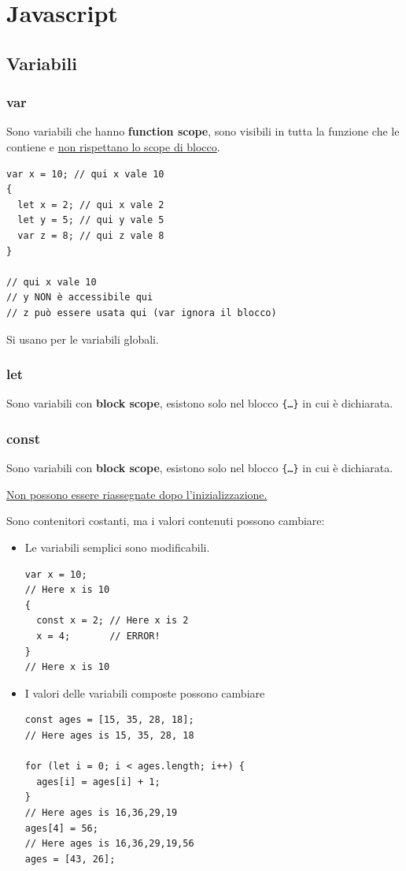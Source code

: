 \chapter{Javascript}
\section{Variabili}
\subsection{var}
Sono variabili che hanno \textbf{function scope}, sono visibili in tutta la funzione che le contiene e \uline{non rispettano lo scope di blocco}.

\begin{lstlisting}
var x = 10; // qui x vale 10
{
  let x = 2; // qui x vale 2
  let y = 5; // qui y vale 5
  var z = 8; // qui z vale 8
}

// qui x vale 10
// y NON è accessibile qui
// z può essere usata qui (var ignora il blocco)
\end{lstlisting}

Si usano per le variabili globali.
\subsection{let}
Sono variabili con \textbf{block scope}, esistono solo nel blocco \texttt{\{\dots\}} in cui è dichiarata.

\subsection{const}
Sono variabili con \textbf{block scope}, esistono solo nel blocco \texttt{\{\dots\}} in cui è dichiarata.

\uline{Non possono essere riassegnate dopo l'inizializzazione.}

Sono contenitori costanti, ma i valori contenuti possono cambiare:
\begin{itemize}
    \item Le variabili semplici sono modificabili.
    \begin{lstlisting}
var x = 10;
// Here x is 10
{
  const x = 2; // Here x is 2
  x = 4;       // ERROR!
}
// Here x is 10
    \end{lstlisting}
    \item I valori delle variabili composte possono cambiare
    \begin{lstlisting}
const ages = [15, 35, 28, 18];
// Here ages is 15, 35, 28, 18

for (let i = 0; i < ages.length; i++) {
  ages[i] = ages[i] + 1;
}
// Here ages is 16,36,29,19
ages[4] = 56;                           
// Here ages is 16,36,29,19,56
ages = [43, 26];
    \end{lstlisting}
\end{itemize}

